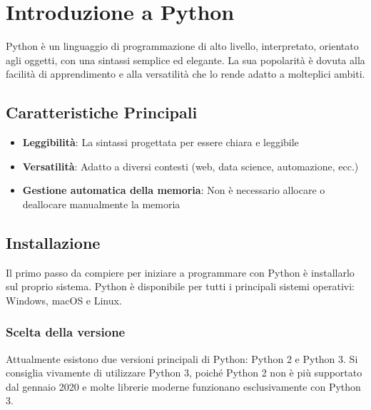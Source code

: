 \newpage

\section{Introduzione a Python}

Python è un linguaggio di programmazione di alto livello, interpretato, orientato agli oggetti, con una sintassi semplice ed elegante. La sua popolarità è dovuta alla facilità di apprendimento e alla versatilità che lo rende adatto a molteplici ambiti.

\subsection{Caratteristiche Principali}
    \begin{itemize}
        \item  \textbf{Leggibilità}: La sintassi progettata per essere chiara e leggibile
        \item   \textbf{Versatilità}: Adatto a diversi contesti (web, data science, automazione, ecc.)
        \item \textbf{Gestione automatica della memoria}: Non è necessario allocare o deallocare manualmente la memoria
    \end{itemize}

\subsection{Installazione}
Il primo passo da compiere per iniziare a programmare con Python è installarlo sul proprio sistema. Python è disponibile per tutti i principali sistemi operativi: Windows, macOS e Linux.
\subsubsection{Scelta della versione}
Attualmente esistono due versioni principali di Python: Python 2 e Python 3. Si consiglia vivamente di utilizzare Python 3, poiché Python 2 non è più supportato dal gennaio 2020 e molte librerie moderne funzionano esclusivamente con Python 3.
